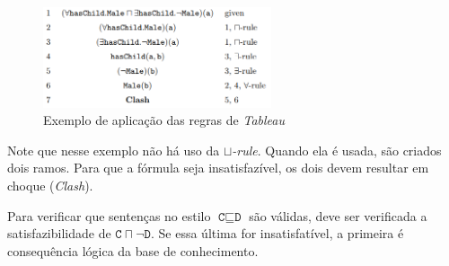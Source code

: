 	\begin{figure}[H]
		\centering
		\includegraphics[width=0.6\textwidth]{Capitulos/Logicas/tableau}
		\caption{Exemplo de aplicação das regras de \textit{Tableau}}
		\label{img:Tableau}
	\end{figure}

Note que nesse exemplo não há uso da \textit{$ \sqcup $-rule}. Quando ela é usada, são criados dois ramos. Para que a fórmula seja insatisfazível, os dois devem resultar em choque (\textit{Clash}).

Para verificar que sentenças no estilo $ \texttt{C} \sqsubseteq \texttt{D} $ são válidas, deve ser verificada a satisfazibilidade de $ \texttt{C} \sqcap \neg \texttt{D} $. Se essa última for insatisfatível, a primeira é consequência lógica da base de conhecimento.